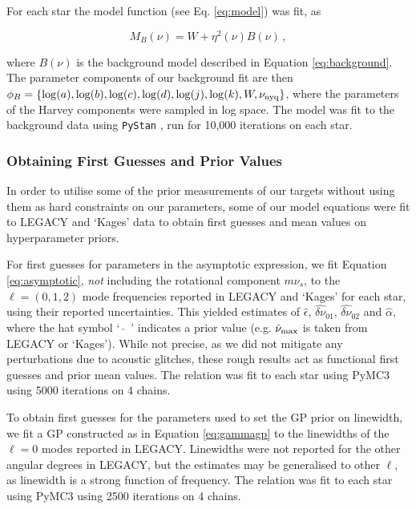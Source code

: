 For each star the model function (see Eq. \ref{eq:model}) was fit, as

\begin{equation}
	M_{B}(\nu) = W + \eta^2(\nu)B(\nu)\, ,
\end{equation}

\noindent where $B(\nu)$ is the background model described in Equation \ref{eq:background}. The parameter components of our background fit are then $\phi_B = \{\log(a), \log(b), \log(c), \log(d), \log(j), \log(k), W, \nu_{\rm nyq}\}$, where the parameters of the Harvey components were sampled in log space. The model was fit to the background data using \texttt{PyStan} \cite{vanhoey+2013}, run for 10,000 iterations on each star. 

\subsubsection{Obtaining First Guesses and Prior Values}
In order to utilise some of the prior measurements of our targets without using them as hard constraints on our parameters, some of our model equations were fit to LEGACY and `Kages' data to obtain first guesses and mean values on hyperparameter priors.

For first guesses for parameters in the asymptotic expression, we fit Equation \ref{eq:asymptotic}, \textit{not} including the rotational component $m\nu_s$, to the $\ell = (0, 1, 2)$ mode frequencies reported in LEGACY and `Kages' for each star, using their reported uncertainties. This yielded estimates of $\hat{\epsilon}$, $\widehat{\delta\nu}_{01}$, $\widehat{\delta\nu}_{02}$ and $\hat{\alpha}$, where the hat symbol `\, $\widehat{}$\, ' indicates a prior value (e.g. $\hat{\nu}_{\rm max}$ is taken from LEGACY or `Kages'). While not precise, as we did not mitigate any perturbations due to acoustic glitches, these rough results act as functional first guesses and prior mean values. The relation was fit to each star using PyMC3 \cite{salvatier+2016} using 5000 iterations on 4 chains.

To obtain first guesses for the parameters used to set the GP prior on linewidth, we fit a GP constructed as in Equation \ref{eq:gammagp} to the linewidths of the $\ell = 0$ modes reported in LEGACY. Linewidths were not reported for the other angular degrees in LEGACY, but the estimates may be generalised to other $\ell$, as linewidth is a strong function of frequency.  The relation was fit to each star using PyMC3 using 2500 iterations on 4 chains.

